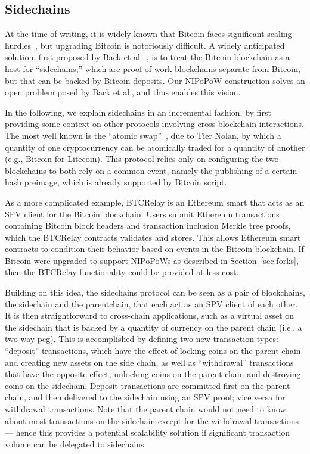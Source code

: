 \subsection{Sidechains}
\label{sec.sidechains}
At the time of writing, it is widely known that Bitcoin faces significant scaling hurdles~\cite{onscaling}, but upgrading Bitcoin is notoriously difficult.
A widely anticipated solution, first proposed by Back et al.~\cite{sidechains}, is to treat the Bitcoin blockchain as a host for ``sidechains,'' which are proof-of-work blockchains separate from Bitcoin, but that can be backed by Bitcoin deposits. Our NIPoPoW construction solves an open problem posed by Back et al., and thus enables this vision.

In the following, we explain sidechains in an incremental fashion, by first providing some context on other protocols involving cross-blockchain interactions. The most well known is the ``atomic swap''~\cite{tiernolan}, due to Tier Nolan, by which a quantity of one cryptocurrency can be atomically traded for a quantity of another (e.g., Bitcoin for Litecoin). This protocol relies only on configuring the two blockchains to both rely on a common event, namely the publishing of a certain hash preimage, which is already supported by Bitcoin script.

As a more complicated example, BTCRelay is an Ethereum \cite{ethereum} smart  that acts as an SPV client for the Bitcoin blockchain.
Users submit Ethereum transactions containing Bitcoin block headers and transaction inclusion Merkle tree proofs, which the BTCRelay contracts validates and stores. This allows Ethereum smart contracts to condition their behavior based on events in the Bitcoin blockchain.
If Bitcoin were upgraded to support NIPoPoWs as described in Section~\ref{sec.forks}, then the BTCRelay functionality could be provided at less cost.

Building on this idea, the sidechains protocol can be seen as a pair of blockchains, the sidechain and the parentchain, that each act as an SPV client of each other.
It is then straightforward to cross-chain applications, such as a virtual asset on the sidechain that is backed by a quantity of currency on the parent chain (i.e., a two-way peg).
This is accomplished by defining two new transaction types: ``deposit'' transactions, which have the effect of locking coins on the parent chain and creating new assets on the side chain, as well as ``withdrawal'' transactions that have the opposite effect, unlocking coins on the parent chain and destroying coins on the sidechain. Deposit transactions are committed first on the parent chain, and then delivered to the sidechain using an SPV proof; vice versa for withdrawal transactions. Note that the parent chain would not need to know about most transactions on the sidechain except for the withdrawal transactions --- hence this provides a potential scalability solution if significant transaction volume can be delegated to sidechains.

